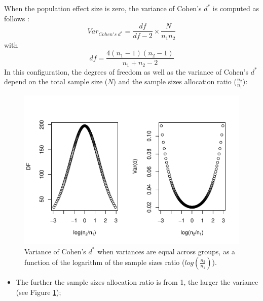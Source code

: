 \documentclass[
  english,
  man,mask]{apa6}
\providecommand{\tightlist}{%
  \setlength{\itemsep}{0pt}\setlength{\parskip}{0pt}}
\begin{document}
When the population effect size is zero, the variance of Cohen's \(d^*\) is computed as follows :
\[Var_{Cohen's \; d^*} = \frac{df}{df-2} \times \frac{N}{n_1n_2}\]
with \[df = \frac{4(n_1-1)(n_2-1)}{n_1+n_2-2}\]
In this configuration, the degrees of freedom as well as the variance of Cohen's \(d^*\) depend on the total sample size (\(N\)) and the sample sizes allocation ratio (\(\frac{n_2}{n_1}\)):

\begin{figure}
\centering
\includegraphics{Theoretical-Bias-of-all-estimators-as-a-function-of-population-parameters_files/figure-latex/varcohendprimeHomNratio2-1.pdf}
\caption{\label{fig:varcohendprimeHomNratio2}Variance of Cohen's \(d^*\) when variances are equal across groups, as a function of the logarithm of the sample sizes ratio (\(log\left(\frac{n_2}{n_1} \right)\)).}
\end{figure}

\begin{itemize}
\tightlist
\item
  The further the sample sizes allocation ratio is from 1, the larger the variance (see Figure \ref{fig:varcohendprimeHomNratio2});
\end{itemize}
\end{document}
